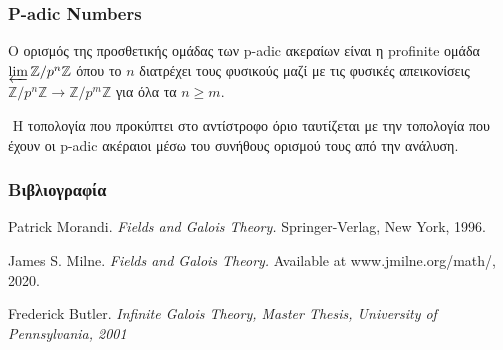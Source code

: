 \documentclass{beamer}
\newcommand {\tl}{\textlatin}
\begin{document}
\begin{frame}
    \frametitle{\tl{P-adic Numbers}}
    Ο ορισμός της προσθετικής ομάδας των \tl{p-adic} ακεραίων είναι η \tl{profinite} ομάδα $\varprojlim \mathbb{Z}/p^n \mathbb{Z}$ όπου το $n$ διατρέχει τους φυσικούς μαζί με τις φυσικές απεικονίσεις $\mathbb{Z}/p^n \mathbb{Z} \rightarrow \mathbb{Z}/p^m \mathbb{Z}$ για όλα τα $n\geq m$.
    
    $ $\newline
    H τοπολογία που προκύπτει στο αντίστροφο όριο ταυτίζεται με την τοπολογία που έχουν οι \tl{p-adic} ακέραιοι μέσω του συνήθους ορισμού τους από την ανάλυση.

\end{frame}


\begin{frame}
\frametitle{Βιβλιογραφία}
\begin{thebibliography}{9}
	\tl{Patrick Morandi.}
	\textit{\tl{Fields and Galois Theory.}}
	\tl{Springer-Verlag, New York, 1996.}

	\tl{James S. Milne.}
	\textit{\tl{Fields and Galois Theory.}}
	\tl{Available at www.jmilne.org/math/, 2020.}
	
	\tl{Frederick Butler.}
	\textit{\tl{Infinite Galois Theory, Master Thesis, University of Pennsylvania, 2001}}
\end{thebibliography}
    
\end{frame}
\end{document}

